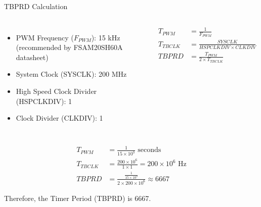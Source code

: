 \begin{frame}{TBPRD Calculation}

	\begin{columns}[T]
			\begin{itemize}
				\item PWM Frequency ($F_{PWM}$): 15 kHz (recommended by FSAM20SH60A datasheet)
				\item System Clock (SYSCLK): 200 MHz
				\item High Speed Clock Divider (HSPCLKDIV): 1
				\item Clock Divider (CLKDIV): 1
			\end{itemize}
			\begin{align*}
				T_{PWM}   & = \frac{1}{F_{PWM}} \\
				T_{TBCLK} & = \frac{SYSCLK}{HSPCLKDIV \times CLKDIV} \\
				TBPRD     & = \frac{T_{PWM}}{2 \times T_{TBCLK}}
			\end{align*}
	\end{columns}

	\vspace{0.5cm}

	\begin{align*}
		T_{PWM}   & = \frac{1}{15 \times 10^3} \text{ seconds} \\
		T_{TBCLK} & = \frac{200 \times 10^6}{1 \times 1} = 200 \times 10^6 \text{ Hz} \\
		TBPRD     & = \frac{\frac{1}{15 \times 10^3}}{2 \times 200 \times 10^6} \approx 6667
	\end{align*}

	\tiny{Therefore, the Timer Period (TBPRD) is 6667.}
\end{frame}


